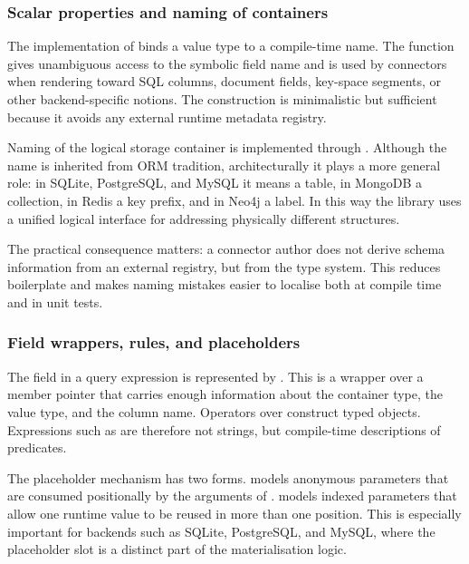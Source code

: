 \subsubsection{Scalar properties and naming of containers}

The implementation of  binds a value type to a compile-time name. The function  gives unambiguous access to the symbolic field name and is used by connectors when rendering toward SQL columns, document fields, key-space segments, or other backend-specific notions. The construction is minimalistic but sufficient because it avoids any external runtime metadata registry.

Naming of the logical storage container is implemented through . Although the name is inherited from ORM tradition, architecturally it plays a more general role: in SQLite, PostgreSQL, and MySQL it means a table, in MongoDB a collection, in Redis a key prefix, and in Neo4j a label. In this way the library uses a unified logical interface for addressing physically different structures.

The practical consequence matters: a connector author does not derive schema information from an external registry, but from the type system. This reduces boilerplate and makes naming mistakes easier to localise both at compile time and in unit tests.

\subsubsection{Field wrappers, rules, and placeholders}

The field in a query expression is represented by . This is a  wrapper over a member pointer that carries enough information about the container type, the value type, and the column name. Operators over  construct typed  objects. Expressions such as  are therefore not strings, but compile-time descriptions of predicates.

The placeholder mechanism has two forms.  models anonymous parameters that are consumed positionally by the arguments of .  models indexed parameters that allow one runtime value to be reused in more than one position. This is especially important for backends such as SQLite, PostgreSQL, and MySQL, where the placeholder slot is a distinct part of the materialisation logic.

